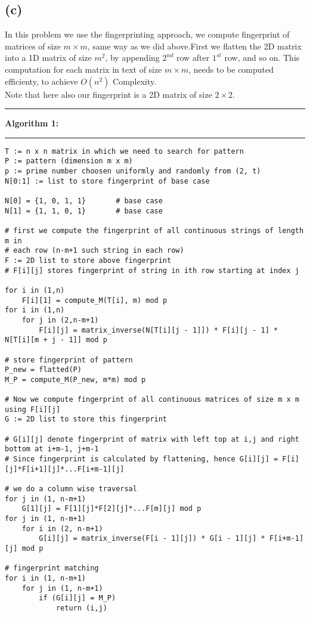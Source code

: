 \documentclass[a4paper]{article}
\begin{document}
\subsection*{(c)}
In this problem we use the fingerprinting approach, we compute fingerprint of matrices of size $m \times m$, same way as we did above.First we flatten the 2D matrix into a 1D matrix of size $m^2$, by appending $2^{nd}$ row after $1^{st}$ row, and so on. This computation for each matrix in text of size $m \times m$, needs to be computed efficienty, to achieve $O(n^2)$ Complexity. \\ 
Note that here also our fingerprint is a 2D matrix of size $2 \times 2$. \\
\noindent\rule{\textwidth}{0.4pt}
\textbf{Algorithm 1:} \\
\noindent\rule{\textwidth}{0.2pt}
\begin{lstlisting}[columns=fullflexible] 
T := n x n matrix in which we need to search for pattern
P := pattern (dimension m x m)
p := prime number choosen uniformly and randomly from (2, t)
N[0:1] := list to store fingerprint of base case

N[0] = {1, 0, 1, 1}       # base case
N[1] = {1, 1, 0, 1}       # base case

# first we compute the fingerprint of all continuous strings of length m in
# each row (n-m+1 such string in each row)
F := 2D list to store above fingerprint
# F[i][j] stores fingerprint of string in ith row starting at index j

for i in (1,n)
    F[i][1] = compute_M(T[i], m) mod p
for i in (1,n)
    for j in (2,n-m+1)
        F[i][j] = matrix_inverse(N[T[i][j - 1]]) * F[i][j - 1] * N[T[i][m + j - 1]] mod p

# store fingerprint of pattern
P_new = flatted(P)
M_P = compute_M(P_new, m*m) mod p

# Now we compute fingerprint of all continuous matrices of size m x m using F[i][j]
G := 2D list to store this fingerprint

# G[i][j] denote fingerprint of matrix with left top at i,j and right bottom at i+m-1, j+m-1
# Since fingerprint is calculated by flattening, hence G[i][j] = F[i][j]*F[i+1][j]*...F[i+m-1][j]

# we do a column wise traversal
for j in (1, n-m+1)
    G[1][j] = F[1][j]*F[2][j]*...F[m][j] mod p
for j in (1, n-m+1)
    for i in (2, n-m+1)
        G[i][j] = matrix_inverse(F[i - 1][j]) * G[i - 1][j] * F[i+m-1][j] mod p

# fingerprint matching
for i in (1, n-m+1)
    for j in (1, n-m+1)
        if (G[i][j] = M_P)
            return (i,j)
\end{lstlisting}
\vspace{1.3em}
\end{document}
